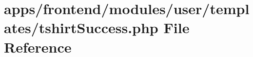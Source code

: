 \hypertarget{frontend_2modules_2user_2templates_2tshirt_success_8php}{\section{apps/frontend/modules/user/templates/tshirt\-Success.php File Reference}
\label{frontend_2modules_2user_2templates_2tshirt_success_8php}
}
